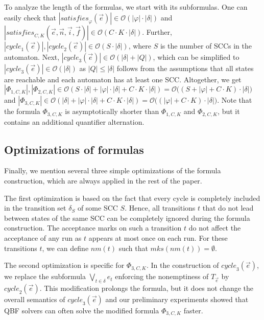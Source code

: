 \documentclass[a4paper,UKenglish,cleveref,autoref,thm-restate]{lipics-v2021}
\newcommand{\mks}{\mathit{mks}}
\newcommand{\rem}{\mathit{nm}}
\newcommand{\mcycle}{\mathit{cycle}}
\newcommand{\msat}{\mathit{satisfies}}
\newcommand{\Te}{T_{\vec{e}}}
\newcommand{\bigO}{\mathcal{O}}
\begin{document}
To analyze the length of the formulas, we start with its subformulas.
One can easily check that
$|\msat_\varphi(\vec{e})|\in\bigO(|\varphi|\cdot|\delta|)$ and
$|\msat_{C,K}(\vec{e},\vec{n},\vec{i},\vec{f})|\in\bigO(C\cdot
K\cdot|\delta|)$. Further,
$|\mcycle_1(\vec{e})|,|\mcycle_2(\vec{e})|\in\bigO(S\cdot|\delta|)$, %
where $S$ is the number of SCCs in the automaton.  Next,
$|\mcycle_3(\vec{e})|\in\bigO(|\delta|+|Q|)$, which can be simplified
to $|\mcycle_3(\vec{e})|\in\bigO(|\delta|)$ as $|Q|\le|\delta|$
follows from the assumptions that all states are reachable and each
automaton has at least one SCC. Altogether, we get
$|\Phi_{1,C,K}|,|\Phi_{2,C,K}|\in\bigO(S\cdot|\delta|+|\varphi|\cdot|\delta|+C\cdot
K\cdot|\delta|)=\bigO\big((S+|\varphi|+C\cdot K)\cdot|\delta|\big)$
and
$|\Phi_{3,C,K}|\in\bigO(|\delta|+|\varphi|\cdot|\delta|+C\cdot
K\cdot|\delta|)=\bigO\big((|\varphi|+C\cdot K)\cdot|\delta|\big)$.
Note that the formula $\Phi_{3,C,K}$ is asymptotically shorter than
$\Phi_{1,C,K}$ and $\Phi_{2,C,K}$, but it contains an additional quantifier
alternation.

\subsection{Optimizations of formulas}

Finally, we mention several three simple optimizations of the formula
construction, which are always applied in the rest of the paper.

The first optimization is based on the fact that every cycle is
completely included in the transition set $\delta_S$ of some SCC
$S$. Hence, all transitions $t$ that do not lead between states of the
same SCC can be completely ignored during the formula
construction. The acceptance marks on such a transition $t$ do not
affect the acceptance of any run as $t$ appears at most once on each
run. For these transitions $t$, we can define $\rem(t)$ such that
$\mks(\rem(t))=\emptyset$.

The second optimization is specific for $\Phi_{3,C,K}$. In the
construction of $\mcycle_3(\vec{e})$, we replace the subformula
$\bigvee_{t\in\delta}e_t$ enforcing the nonemptiness of $\Te$ by
$\mcycle_2(\vec{e})$. This modification prolongs the formula, but it
does not change the overall semantics of $\mcycle_3(\vec{e})$ and our
preliminary experiments showed that QBF solvers can often solve the
modified formula $\Phi_{3,C,K}$ faster.
\end{document}
